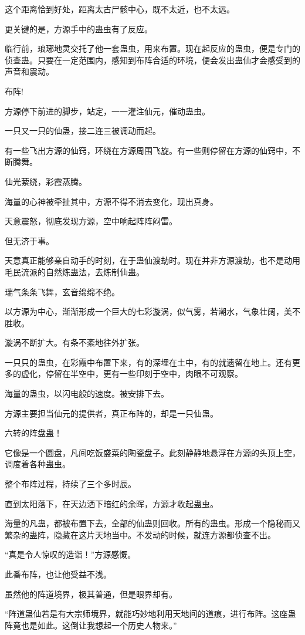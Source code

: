 \begin{this_body}
这个距离恰到好处，距离太古尸骸中心，既不太近，也不太远。

更关键的是，方源手中的蛊虫有了反应。

临行前，琅琊地灵交托了他一套蛊虫，用来布置。现在起反应的蛊虫，便是专门的侦查蛊。只要在一定范围内，感知到布阵合适的环境，便会发出蛊仙才会感受到的声音和震动。

布阵!

方源停下前进的脚步，站定，一一灌注仙元，催动蛊虫。

一只又一只的仙蛊，接二连三被调动而起。

有一些飞出方源的仙窍，环绕在方源周围飞旋。有一些则停留在方源的仙窍中，不断腾舞。

仙光萦绕，彩霞蒸腾。

海量的心神被牵扯其中，方源不得不消去变化，现出真身。

天意震怒，彻底发现方源，空中响起阵阵闷雷。

但无济于事。

天意真正能够亲自动手的时刻，在于蛊仙渡劫时。现在并非方源渡劫，也不是动用毛民流派的自然炼蛊法，去炼制仙蛊。

瑞气条条飞舞，玄音绵绵不绝。

以方源为中心，渐渐形成一个巨大的七彩漩涡，似气雾，若潮水，气象壮阔，美不胜收。

漩涡不断扩大。有条不紊地往外扩张。

一只只的蛊虫，在彩霞中布置下来，有的深埋在土中，有的就遗留在地上。还有更多的虚化，停留在半空中，更有一些印刻于空中，肉眼不可观察。

海量的蛊虫，以闪电般的速度。被安排下去。

方源主要担当仙元的提供者，真正布阵的，却是一只仙蛊。

六转的阵盘蛊！

它像是一个圆盘，凡间吃饭盛菜的陶瓷盘子。此刻静静地悬浮在方源的头顶上空，调度着各种蛊虫。

整个布阵过程，持续了三个多时辰。

直到太阳落下，在天边洒下暗红的余晖，方源才收起蛊虫。

海量的凡蛊，都被布置下去，全部的仙蛊则回收。所有的蛊虫。形成一个隐秘而又繁杂的蛊阵，隐藏在这片天地当中。不发动的时候，就连方源都侦查不出。

“真是令人惊叹的造诣！”方源感慨。

此番布阵，也让他受益不浅。

虽然他的阵道境界，极其普通，但是眼界却有。

“阵道蛊仙若是有大宗师境界，就能巧妙地利用天地间的道痕，进行布阵。这座蛊阵竟也是如此。这倒让我想起一个历史人物来。”


\end{this_body}
